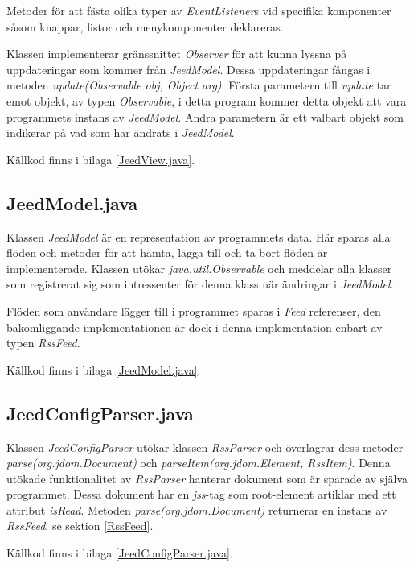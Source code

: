 \documentclass[titlepage, twoside, a4paper, 12pt]{article}
\begin{document}
Metoder för att fästa olika typer av \textit{EventListener}s vid
specifika komponenter såsom knappar, listor och menykomponenter
deklareras.

Klassen implementerar gränssnittet \textit{Observer} för att kunna
lyssna på uppdateringar som kommer från \textit{JeedModel}. Dessa
uppdateringar fångas i metoden \textit{update(Observable obj, Object
  arg)}. Första parametern till \textit{update} tar emot objekt, av
typen \textit{Observable}, i detta program kommer detta objekt att
vara programmets instans av \textit{JeedModel}. Andra parametern är
ett valbart objekt som indikerar på vad som har ändrats i
\textit{JeedModel}. %

Källkod finns i bilaga \ref{JeedView.java}.

\subsection{JeedModel.java}\label{JeedModel}
Klassen \textit{JeedModel} är en representation av programmets
data. Här sparas alla flöden och metoder för att hämta, lägga till och
ta bort flöden är implementerade. Klassen utökar
\textit{java.util.Observable} och meddelar alla klasser som
registrerat sig som intressenter för denna klass när ändringar i
\textit{JeedModel}.

Flöden som användare lägger till i programmet sparas i \textit{Feed}
referenser, den bakomliggande implementationen är dock i denna
implementation enbart av typen \textit{RssFeed}.


Källkod finns i bilaga \ref{JeedModel.java}.

\subsection{JeedConfigParser.java}\label{JeedConfigParser}
Klassen \textit{JeedConfigParser} utökar klassen \textit{RssParser}
och överlagrar dess metoder \textit{parse(org.jdom.Document)} och
\textit{parseItem(org.jdom.Element, RssItem)}. Denna utökade
funktionalitet av \textit{RssParser} hanterar dokument som är sparade
av själva programmet. Dessa dokument har en \textit{jss}-tag som root-element
artiklar med ett attribut \textit{isRead}. Metoden
\textit{parse(org.jdom.Document)} returnerar en instans av
\textit{RssFeed}, se sektion \ref{RssFeed}.

Källkod finns i bilaga \ref{JeedConfigParser.java}.
\end{document}
